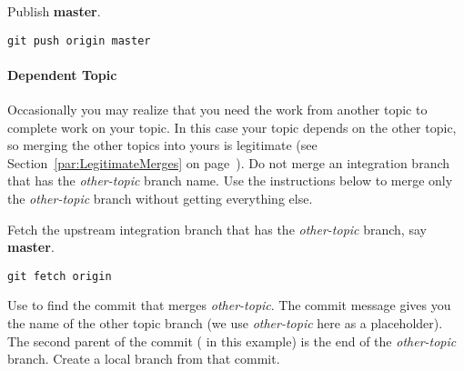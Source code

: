 Publish \textbf{master}.

\begin{verbatim}
git push origin master
\end{verbatim}


\paragraph{Dependent Topic}
\label{par:DependentTopic}

Occasionally you may realize that you need the work from another topic to
complete work on your topic. In this case your topic depends on the other
topic, so merging the other topics into yours is legitimate (see
Section~\ref{par:LegitimateMerges} on page~\pageref{par:LegitimateMerges}). Do
not merge an integration branch that has the \textit{other-topic} branch name.
Use the instructions below to merge only the \textit{other-topic} branch
without getting everything else.

Fetch the upstream integration branch that has the \textit{other-topic} branch,
say \textbf{master}.

\begin{verbatim}
git fetch origin
\end{verbatim}

\begin{figure}
\centering
{}
\label{fig:FetchUpstreamBranch}
\end{figure}

Use  to find the commit that merges
\textit{other-topic}. The commit message gives you the name of the other topic
branch (we use \textit{other-topic} here as a placeholder). The second parent of
the commit ( in this example) is the end of the
\textit{other-topic} branch. Create a local branch from that commit.

